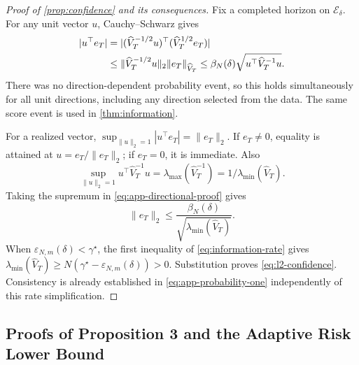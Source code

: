 \documentclass[10pt,twoside,letterpaper]{article}
\newcommand{\norm}[1]{\lVert #1\rVert}
\newcommand{\Vhat}{\widehat V}
\begin{document}
\begin{proof}[Proof of \cref{prop:confidence} and its consequences]
Fix a completed horizon on $\mathcal E_\delta$. For any unit vector $u$,
Cauchy--Schwarz gives
\begin{align}
|u^\top e_T|
&=|(\Vhat_T^{-1/2}u)^\top(\Vhat_T^{1/2}e_T)|\notag\\
&\le\norm{\Vhat_T^{-1/2}u}_2\norm{e_T}_{\Vhat_T}
\le\beta_N(\delta)\sqrt{u^\top\Vhat_T^{-1}u}.
\label{eq:app-directional-proof}
\end{align}
There was no direction-dependent probability event, so this holds
simultaneously for all unit directions, including any direction
selected from the data. The same score event is used in
\cref{thm:information}.

For a realized vector, $\sup_{\norm{u}_2=1}|u^\top e_T|=\norm{e_T}_2$.
If $e_T\ne0$, equality is attained at $u=e_T/\norm{e_T}_2$; if
$e_T=0$, it is immediate. Also
\begin{equation}
\sup_{\norm{u}_2=1}u^\top\Vhat_T^{-1}u
=\lambda_{\max}(\Vhat_T^{-1})
=1/\lambda_{\min}(\Vhat_T).
\label{eq:app-ellipsoid-largest-radius}
\end{equation}
Taking the supremum in \eqref{eq:app-directional-proof} gives
\begin{equation}
\norm{e_T}_2\le\frac{\beta_N(\delta)}
{\sqrt{\lambda_{\min}(\Vhat_T)}}.
\label{eq:app-euclidean-ellipsoid}
\end{equation}
When $\varepsilon_{N,m}(\delta)<\gamma^\star$, the first inequality
of \eqref{eq:information-rate} gives
$\lambda_{\min}(\Vhat_T)\ge
N(\gamma^\star-\varepsilon_{N,m}(\delta))>0$.
Substitution proves \eqref{eq:l2-confidence}. Consistency is already
established in \eqref{eq:app-probability-one} independently of this
rate simplification.
\end{proof}

\subsection{Proofs of Proposition 3 and the Adaptive Risk Lower Bound}
\label{app:lower}
\end{document}
